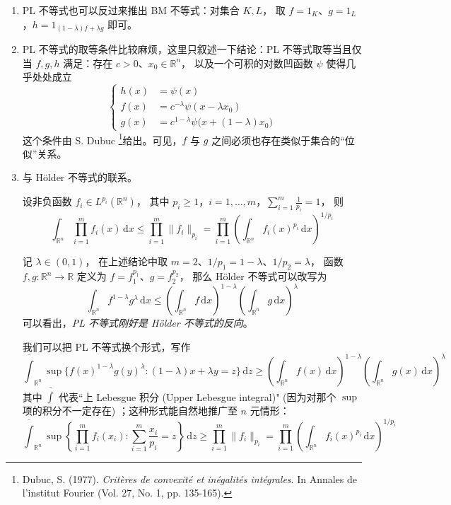 \begin{enumerate}
\item PL 不等式也可以反过来推出 BM 不等式：对集合 $K,L$， 取 $f=1_K$、$g=1_L$，$h=1_{(1-\lambda) f+\lambda g}$ 即可。
\item PL 不等式的取等条件比较麻烦，这里只叙述一下结论：PL 不等式取等当且仅当 $f,g,h$ 满足：存在 $c>0$、$x_0\in\mathbb{R}^n$， 以及一个可积的对数凹函数 $\psi$ 使得几乎处处成立
\begin{equation*}\left\{
\begin{aligned}
h(x)&=\psi(x)\\
f(x)&=c^{-\lambda}\psi(x-\lambda x_0)\\
g(x)&=c^{1-\lambda}\psi\big(x+(1-\lambda)x_0\big)
\end{aligned}\right.
\end{equation*}
这个条件由 S. Dubuc \footnote{Dubuc, S. (1977). \textit{Critères de convexité et inégalités intégrales}. In Annales de l'institut Fourier (Vol. 27, No. 1, pp. 135-165).}给出。可见，$f$ 与 $g$ 之间必须也存在类似于集合的“位似”关系。

\item 与 Hölder 不等式的联系。

\begin{theorem*}
设非负函数 $f_i\in L^{p_i}(\mathbb{R}^n)$， 其中 $p_i\ge 1$，$i=1,\ldots,m$，$\displaystyle\sum_{i=1}^m\frac1{p_i}=1$， 则
\[
\int_{\mathbb{R}^n}\prod_{i=1}^mf_i(x)\,\mathrm{d}x\leq\prod_{i=1}^m\|f_i\|_{p_i}=\prod_{i=1}^m\left(\int_{\mathbb{R}^n}f_i(x)^{p_i}\,\mathrm{d}x\right)^{1/p_i}
\]
\end{theorem*}


记 $\lambda\in(0,1)$， 在上述结论中取 $m=2$、$1/p_1=1-\lambda$、$1/p_2=\lambda$， 函数 $f,g:\mathbb{R}^n\to\mathbb{R}$ 定义为 $f=f_1^{p_1}$、$g=f_2^{p_2}$， 那么 Hölder 不等式可以改写为
\[
\int_{\mathbb{R}^n} f^{1-\lambda} g^{\lambda}\,\mathrm{d}x\le\left(\int_{\mathbb{R}^n} f\,\mathrm{d}x\right)^{1-\lambda}\left(\int_{\mathbb{R}^n}g\,\mathrm{d}x\right)^{\lambda}
\]
可以看出，\emph{PL 不等式刚好是 Hölder 不等式的反向}。

我们可以把 PL 不等式换个形式，写作
\[
\overline{\int}_{\mathbb{R}^n}\sup\{f(x)^{1-\lambda}g(y)^\lambda:(1-\lambda)x+\lambda y=z\}\,\mathrm{d}z\geq\left(\int_{\mathbb{R}^n}f(x)\,\mathrm{d}x\right)^{1-\lambda}\left(\int_{\mathbb{R}^n}g(x)\,\mathrm{d}x\right)^\lambda
\]
其中 $\overline\int$ 代表``上 Lebesgue 积分 (Upper Lebesgue integral)" (因为对那个 $\sup$ 项的积分不一定存在) ；这种形式能自然地推广至 $n$ 元情形：
\[
\overline{\int}_{\mathbb{R}^n}\sup\left\{\prod_{i=1}^mf_i(x_i):\sum_{i=1}^m\frac{x_i}{p_i}=z\right\}\,\mathrm{d}z\geq\prod_{i=1}^m\|f_i\|_{p_i}=\prod_{i=1}^m\left(\int_{\mathbb{R}^n}f_i(x)^{p_i}\,\mathrm{d}x\right)^{1/p_i}
\]
\end{enumerate}

